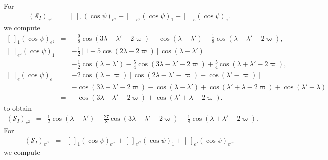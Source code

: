 \documentclass [12pt, a4paper] {article}
\begin{document}
For 
\begin {eqnarray}
    \left(
        \mathcal{S}_I
    \right)_{e^2}
    &=&
    \left[\:\right]_1\left(\cos\psi\right)_{e^2}
    +
    \left[\:\right]_{e^2}\left(\cos\psi\right)_{1}
    +
    \left[\:\right]_e\left(\cos\psi\right)_{e}.
\end {eqnarray}
we compute 
\begin {eqnarray}
    \left[\:\right]_1\left(\cos\psi\right)_{e^2}
    &=& 
    -
    \frac{9}{8}\cos(3\lambda - \lambda' - 2\varpi)
    +
    \cos(\lambda - \lambda')
    +
    \frac{1}{8}\cos(\lambda + \lambda' - 2\varpi),
    \\
    \left[\:\right]_{e^2}\left(\cos\psi\right)_{1}
    &=&
    - \frac{1}{2}[1 + 5\cos(2\lambda - 2\varpi)]
    \cos(\lambda - \lambda')
    \\
    &=&
    -\frac{1}{2}\cos(\lambda - \lambda')
    -
    \frac{5}{4}\cos(3\lambda - \lambda' - 2\varpi)
    +
    \frac{5}{4}\cos(\lambda + \lambda' - 2\varpi),
    \\
    \left[\:\right]_e\left(\cos\psi\right)_{e}
    &=&
    -2\cos(\lambda - \varpi)
    \left[
        \cos(2\lambda - \lambda' - \varpi) - \cos(\lambda' - \varpi)
    \right]
    \\
    &=&
    -\cos(3\lambda - \lambda' - 2\varpi)
    -\cos(\lambda - \lambda')
    +\cos(\lambda' + \lambda - 2\varpi)
    +\cos(\lambda' - \lambda)
    \\
    &=&
    -\cos(3\lambda - \lambda' - 2\varpi)
    +\cos(\lambda' + \lambda - 2\varpi).
\end {eqnarray}
to obtain 
\begin {eqnarray}
    \left(
        \mathcal{S}_I
    \right)_{e^2}
    &=& 
    \frac{1}{2}\cos(\lambda - \lambda')
    -
    \frac{27}{8}\cos(3\lambda - \lambda' - 2\varpi)
    -
    \frac{1}{8}\cos(\lambda + \lambda' - 2\varpi).
\end {eqnarray}
For 
\begin {eqnarray}
    \left(
        \mathcal{S}_I
    \right)_{e'^2}
    &=&
    \left[\:\right]_1\left(\cos\psi\right)_{e'^2}
    +
    \left[\:\right]_{e'^2}\left(\cos\psi\right)_{1}
    +
    \left[\:\right]_{e'}\left(\cos\psi\right)_{e'}.
\end {eqnarray}
we compute 
\end{document}
